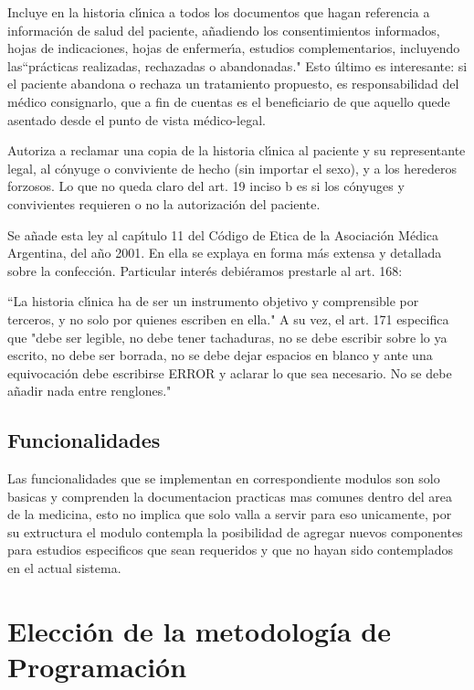 Incluye en la historia cl\'{\i}nica a todos los documentos que hagan referencia a 
informaci\'on de salud del paciente, a\~nadiendo los consentimientos informados, 
hojas de indicaciones, hojas de enfermer\'{\i}a, estudios complementarios, 
incluyendo las``pr\'acticas realizadas, rechazadas o abandonadas." 
Esto  \'ultimo es interesante: si el paciente abandona o rechaza un tratamiento 
propuesto, es responsabilidad del m\'edico consignarlo, que a fin de cuentas es el
beneficiario de que aquello quede asentado desde el punto de vista m\'edico-legal.

Autoriza a reclamar una copia de la historia cl\'{\i}nica al paciente y su representante 
legal, al c\'onyuge o conviviente de hecho (sin importar el sexo), y a los herederos 
forzosos. Lo que no queda claro del art. 19 inciso b es si los c\'onyuges y 
convivientes requieren o no la autorizaci\'on del paciente.

Se a\~nade esta ley al cap\'{\i}tulo 11 del C\'odigo de Etica de la Asociaci\'on M\'edica 
Argentina, del a\~no 2001. En ella se explaya en forma m\'as extensa y detallada sobre
la confecci\'on. Particular inter\'es debi\'eramos prestarle al art. 168:

``La historia cl\'{\i}nica ha de ser un instrumento objetivo y comprensible por terceros,
y no solo por quienes escriben en ella." A su vez, el art. 171 especifica que 
"debe ser legible, no debe tener tachaduras, no se debe escribir sobre lo ya 
escrito, no debe ser borrada, no se debe dejar espacios en blanco y ante una
equivocaci\'on debe escribirse ERROR y aclarar lo que sea necesario. No se debe a\~nadir
nada entre renglones."


\subsection{Funcionalidades}

Las funcionalidades que se implementan en correspondiente modulos son solo
basicas y comprenden la documentacion practicas mas comunes dentro del area de la 
medicina, esto no implica que solo valla a servir para eso unicamente, por su 
extructura el modulo contempla la posibilidad de agregar nuevos componentes para 
estudios especificos que sean requeridos y que no hayan sido contemplados en el 
actual sistema.







\section{Elecci\'on de la metodolog\'ia de Programaci\'on}

